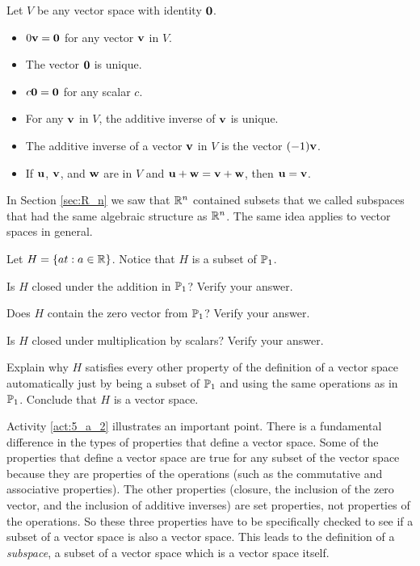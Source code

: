 \begin{theorem} Let $V$ be any vector space with identity $\mathbf{0}$. 
\begin{itemize}
\item $0 \mathbf{v} = \mathbf{0}$ for any vector $\mathbf{v}$ in $V$.  
\item The vector $\mathbf{0}$ is unique.
\item $c \mathbf{0} = \mathbf{0}$ for any scalar $c$.
\item For any $\mathbf{v}$ in $V$, the additive inverse of $\mathbf{v}$ is unique.
\item The additive inverse of a vector $\mathbf{v}$ in $V$ is the vector $(-1)\mathbf{v}$. 
\item If $\mathbf{u}$, $\mathbf{v}$, and $\mathbf{w}$ are in $V$ and $\mathbf{u} + \mathbf{w} = \mathbf{v} + \mathbf{w}$, then $\mathbf{u} = \mathbf{v}$. 
\end{itemize}
\end{theorem}


\label{sec:subspaces}

In Section \ref{sec:R_n} we saw that $\mathbb{R}^n$ contained subsets that we called subspaces that had the same algebraic structure as $\mathbb{R}^n$. The same idea applies to vector spaces in general. 



\begin{activity} \label{act:5_a_2} Let $H = \left\{ at : a \in \mathbb{R} \right\}$. Notice that $H$ is a subset of $\mathbb{P}_1$.
    \ba
    \item Is $H$ closed under the addition in $\mathbb{P}_1$? Verify your answer.

    

    \item Does $H$ contain the zero vector from $\mathbb{P}_1$? Verify your answer.

    

    \item Is $H$ closed under multiplication by scalars? Verify your answer.

    

    \item Explain why $H$ satisfies every other property of the definition of a vector space automatically just by being a subset of $\mathbb{P}_1$ and using the same operations as in $\mathbb{P}_1$. Conclude that $H$ is a vector space.



    \ea
\end{activity}



Activity \ref{act:5_a_2} illustrates an important point. There is a fundamental difference in the types of properties that define a vector space. Some of the properties that define a vector space are true for any subset of the vector space because they are properties of the operations (such as the commutative and associative properties). The other properties (closure, the inclusion of the zero vector, and the inclusion of additive inverses) are set properties, not properties of the operations. So these three properties have to be specifically checked to see if a subset of a vector space is also a vector space.  This leads to the definition of a \emph{subspace}, a subset of a vector space which is a vector space itself.

